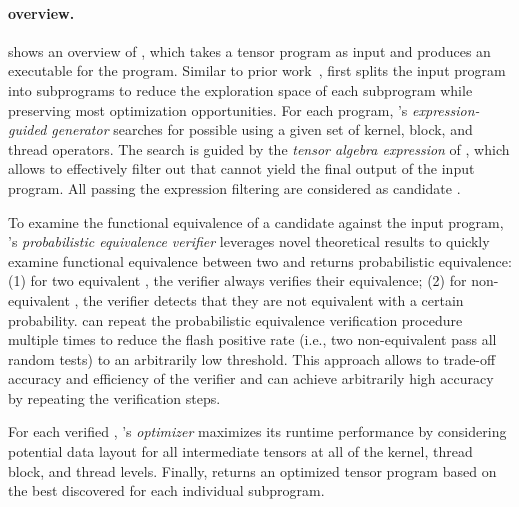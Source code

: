 \paragraph{\sys overview.}
 shows an overview of \sys, which takes a tensor program as input and produces an executable for the program. Similar to prior work~\cite{wang2021pet, ansor}, \sys first splits the input program into \lax subprograms to reduce the exploration space of each \lax subprogram while preserving most optimization opportunities.
%
For each \lax program, \sys's {\em expression-guided \graph generator} searches for possible \graphs using a given set of kernel, block, and thread operators.
%
The search is guided by the {\em tensor algebra expression} of \graphs, which allows \sys to effectively filter out \graphs that cannot yield the final output of the input \lax program.
All \graphs passing the expression filtering are considered as candidate \graphs. 

To examine the functional equivalence of a candidate \graph against the input \lax program, \sys's {\em probabilistic equivalence verifier} leverages novel theoretical results to quickly examine functional equivalence between two \lax \graphs and returns probabilistic equivalence: (1) for two equivalent \graphs, the verifier always verifies their equivalence; (2) for non-equivalent \graphs, the verifier detects that they are not equivalent with a certain probability.
%
\sys can repeat the probabilistic equivalence verification procedure multiple times to reduce the flash positive rate (i.e., two non-equivalent \graphs pass all random tests) to an arbitrarily low threshold.
%
This approach allows \sys to trade-off accuracy and efficiency of the verifier and can achieve arbitrarily high accuracy by repeating the verification steps.

For each verified \graph, \sys's {\em \graph optimizer} maximizes its runtime performance by considering potential data layout for all intermediate tensors at all of the kernel, thread block, and thread levels.
%
Finally, \sys returns an optimized tensor program based on the best discovered \graph for each individual \lax subprogram.

